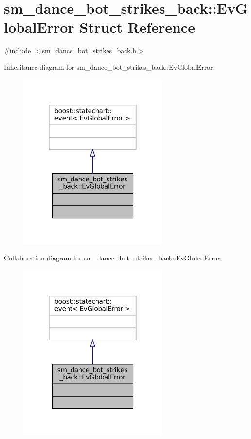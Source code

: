 \hypertarget{structsm__dance__bot__strikes__back_1_1EvGlobalError}{}\section{sm\+\_\+dance\+\_\+bot\+\_\+strikes\+\_\+back\+:\+:Ev\+Global\+Error Struct Reference}
\label{structsm__dance__bot__strikes__back_1_1EvGlobalError}


{\ttfamily \#include $<$sm\+\_\+dance\+\_\+bot\+\_\+strikes\+\_\+back.\+h$>$}



Inheritance diagram for sm\+\_\+dance\+\_\+bot\+\_\+strikes\+\_\+back\+:\+:Ev\+Global\+Error\+:
\nopagebreak
\begin{figure}[H]
\begin{center}
\leavevmode
\includegraphics[width=214pt]{structsm__dance__bot__strikes__back_1_1EvGlobalError__inherit__graph}
\end{center}
\end{figure}


Collaboration diagram for sm\+\_\+dance\+\_\+bot\+\_\+strikes\+\_\+back\+:\+:Ev\+Global\+Error\+:
\nopagebreak
\begin{figure}[H]
\begin{center}
\leavevmode
\includegraphics[width=214pt]{structsm__dance__bot__strikes__back_1_1EvGlobalError__coll__graph}
\end{center}
\end{figure}


